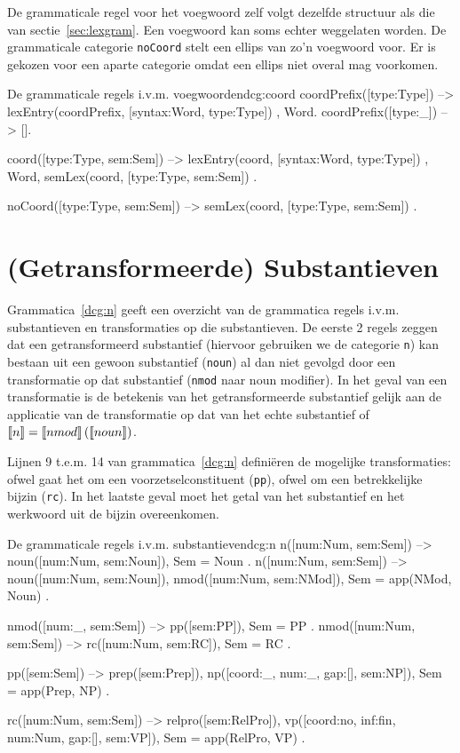 De grammaticale regel voor het voegwoord zelf volgt dezelfde structuur als die van sectie~\ref{sec:lexgram}. Een voegwoord kan soms echter weggelaten worden. De grammaticale categorie \texttt{noCoord} stelt een ellips van zo'n voegwoord voor. Er is gekozen voor een aparte categorie omdat een ellips niet overal mag voorkomen.
\begin{dcg}{De grammaticale regels i.v.m. voegwoorden}{dcg:coord}
coordPrefix([type:Type]) -->
  { lexEntry(coordPrefix, [syntax:Word, type:Type]) },
  Word.
coordPrefix([type:_]) -->
  [].

coord([type:Type, sem:Sem]) -->
  { lexEntry(coord, [syntax:Word, type:Type]) },
  Word,
  { semLex(coord, [type:Type, sem:Sem]) }.

noCoord([type:Type, sem:Sem]) -->
  { semLex(coord, [type:Type, sem:Sem]) }.
\end{dcg} 

\section{(Getransformeerde) Substantieven}
Grammatica~\ref{dcg:n} geeft een overzicht van de grammatica regels i.v.m. substantieven en transformaties op die substantieven. De eerste 2 regels zeggen dat een getransformeerd substantief (hiervoor gebruiken we de categorie \texttt{n}) kan bestaan uit een gewoon substantief (\texttt{noun}) al dan niet gevolgd door een transformatie op dat substantief (\texttt{nmod} naar noun modifier). In het geval van een transformatie is de betekenis van het getransformeerde substantief gelijk aan de applicatie van de transformatie op dat van het echte substantief of $\llbracket n\rrbracket = \llbracket nmod\rrbracket \left( \llbracket noun\rrbracket \right)$.

Lijnen 9 t.e.m. 14 van grammatica~\ref{dcg:n} definiëren de mogelijke transformaties: ofwel gaat het om een voorzetselconstituent (\texttt{pp}), ofwel om een betrekkelijke bijzin (\texttt{rc}). In het laatste geval moet het getal van het substantief en het werkwoord uit de bijzin overeenkomen.

\begin{dcg}{De grammaticale regels i.v.m. substantieven}{dcg:n}
n([num:Num, sem:Sem]) -->
  noun([num:Num, sem:Noun]),
  { Sem = Noun }.
n([num:Num, sem:Sem]) -->
  noun([num:Num, sem:Noun]),
  nmod([num:Num, sem:NMod]),
  { Sem = app(NMod, Noun) }.

nmod([num:_, sem:Sem]) -->
  pp([sem:PP]),
  { Sem = PP }.
nmod([num:Num, sem:Sem]) -->
  rc([num:Num, sem:RC]),
  { Sem = RC }.

pp([sem:Sem]) -->
  prep([sem:Prep]),
  np([coord:_, num:_, gap:[], sem:NP]),
  { Sem = app(Prep, NP) }.

rc([num:Num, sem:Sem]) -->
  relpro([sem:RelPro]),
  vp([coord:no, inf:fin, num:Num, gap:[], sem:VP]),
  { Sem = app(RelPro, VP) }.
\end{dcg}

